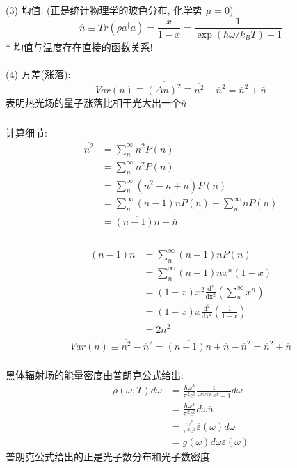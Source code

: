 \begin{frame} 
\frametitle{}
    (3) 均值: (正是统计物理学的玻色分布, 化学势 $\mu=0 $)
    \[ \overline{n} \equiv Tr(\rho a^{\dagger} a) = \frac{x}{1-x} = \frac{1}{\exp(\hbar \omega / k_B T) -1}  \] 
     * 均值与温度存在直接的函数关系! \\ 
     ~\\ 
    (4) 方差(涨落):
    \[ Var(n) \equiv \overline{ (\Delta n)^2 } \equiv \overline{ n^2 } - \overline{ n }^2  = \overline{ n }^2 + \overline{ n }\]   
    表明热光场的量子涨落比相干光大出一个$\overline{ n }$ 
   \end{frame}

   \begin{frame}
    \frametitle{}
        计算细节:
    \[\begin{aligned}
        \overline{n^2} &= \sum_{n} ^\infty  n^2 P(n)  \\ 
        &= \sum_{n} ^\infty  n^2 P(n) \\ 
        &= \sum_{n} ^\infty  (n^2-n +n) P(n) \\ 
        &= \sum_{n} ^\infty  (n-1)n  P(n)  + \sum_{n} ^\infty  n  P(n)  \\    
        &= \overline{(n-1)n}  + \overline{n}   
    \end{aligned} \]     
   \end{frame}

   \begin{frame}
    \frametitle{}
    \[\begin{aligned}
        \overline{(n-1)n } &= \sum_{n} ^\infty  (n-1)n  P(n)   \\ 
        &= \sum_{n} ^\infty  (n-1)n  x^n (1-x)  \\    
        &= (1-x)x^2 \frac{\mathrm{d}^2 }{\mathrm{dx^2}}\left( \sum_{n} ^\infty x^n \right)  \\
        &=  (1-x)x \frac{\mathrm{d}^2 }{\mathrm{dx^2}}\left( \frac{1}{1-x} \right) \\
        &=  2 \overline{n}^2\\ 
    \end{aligned} \]   
     \[ Var(n) \equiv \overline{ n^2 } - \overline{ n }^2  = \overline{(n-1)n}  + \overline{n} - \overline{ n }^2= \overline{ n }^2 + \overline{ n }\]  
   \end{frame}

   \begin{frame} 
    \frametitle{}
    黑体辐射场的能量密度由普朗克公式给出:
    \[\begin{aligned}
        \rho(\omega, T) d \omega &=\frac{\hbar \omega ^3}{\pi ^2 c^{3}} \frac{1}{e^{\hbar \omega / K_B T}-1} d \omega \\ 
        &= \frac{\hbar \omega ^3}{\pi ^2 c^{3}} d \omega \overline{n}  \\
        &= \frac{ \omega ^2}{\pi ^2 c^{3}} \overline{\varepsilon}(\omega) d \omega \\ 
        &= g(\omega)d \omega \overline{\varepsilon}(\omega)  
    \end{aligned}\]
    普朗克公式给出的正是光子数分布和光子数密度
   \end{frame}

